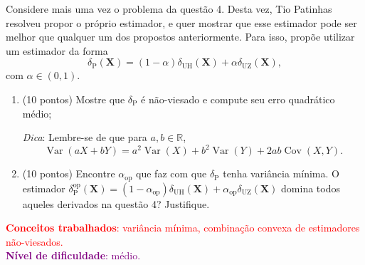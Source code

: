 \documentclass[a4paper,10pt, notitlepage]{report}
\newcommand{\vr}{\operatorname{Var}} %
\newcommand{\bX}{\boldsymbol{X}} %
\begin{document}
Considere mais uma vez o problema da questão 4.
Desta vez, Tio Patinhas resolveu propor o próprio estimador, e quer mostrar que esse estimador pode ser melhor que qualquer um dos propostos 
anteriormente.
Para isso, propõe utilizar um estimador da forma
$$
\delta_{\text{P}}(\bX) = (1-\alpha) \delta_{\text{UH}}(\bX) + \alpha \delta_{\text{UZ}}(\bX),
$$
com $\alpha \in (0, 1)$.
\begin{enumerate}[label=\alph*)]
 \item (10 pontos) Mostre que $\delta_{\text{P}}$ é não-viesado e compute seu erro quadrático médio;
 
 \textit{Dica}: Lembre-se de que para $a,b \in \mathbb{R}$,
 $$\vr\left(aX + bY\right) = a^2\vr(X) + b^2\vr(Y) + 2ab\operatorname{Cov}(X, Y).$$
 \item (10 pontos) Encontre $\alpha_{\text{op}}$ que faz com que $\delta_{\text{P}}$ tenha variância mínima.
 O estimador $\delta_{\text{P}}^{\text{op}}(\bX) = (1-\alpha_{\text{op}}) \delta_{\text{UH}}(\bX) + \alpha_{\text{op}} \delta_{\text{UZ}}(\bX)$ domina todos aqueles derivados na questão 4? Justifique.
\end{enumerate}
\textcolor{red}{\textbf{Conceitos trabalhados}: variância mínima, combinação convexa de estimadores não-viesados.}
\\
\textcolor{purple}{\textbf{Nível de dificuldade}: médio.}
\\
\end{document}
